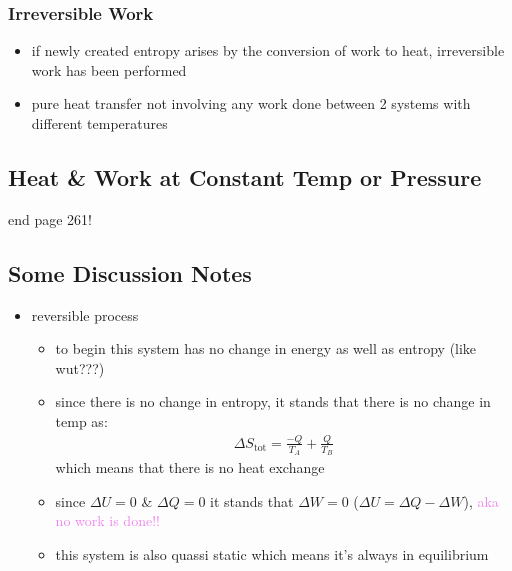 \subsubsection{Irreversible Work}
\begin{itemize}
	\item if newly created entropy arises by the conversion of work to heat, irreversible
	      work has been performed
	\item pure heat transfer not involving any work done between 2 systems with different temperatures
\end{itemize}


\subsection{Heat \& Work at Constant Temp or Pressure }




end page 261!


\subsection{Some Discussion Notes}
\begin{itemize}
	\item reversible process
	      \begin{itemize}
		      \item to begin this system has no change in energy as well as entropy (like wut???)
		      \item since there is no change in entropy, it stands that there is no change in temp as:
		            \begin{align}
			            \Delta S_\text{tot} = \frac{-Q}{T_A} + \frac{Q}{T_B}
		            \end{align}
		            which means that there is no heat exchange
		      \item since $\Delta U = 0$ \& $\Delta Q = 0$ it stands that $\Delta W = 0$
		            ($\Delta U = \Delta Q - \Delta W$), \textcolor{violet}{aka no work is done!!}
		      \item this system is also quassi static which means it's always in equilibrium
	      \end{itemize}
\end{itemize}
